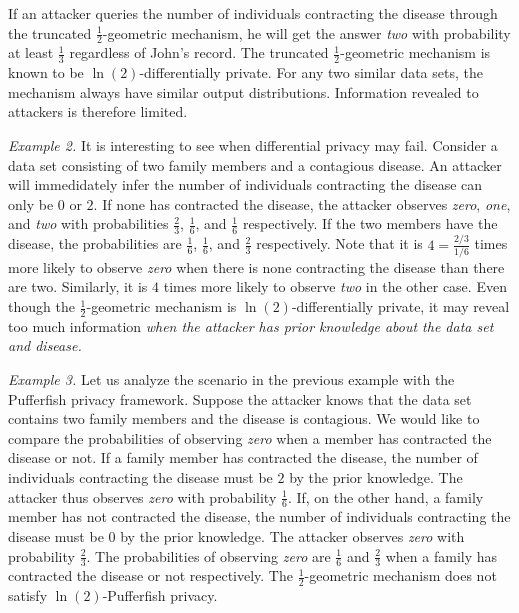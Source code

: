 If an attacker queries the number of individuals contracting the
disease through the truncated $\frac{1}{2}$-geometric mechanism, 
he will get the answer \textit{two} with probability at least
$\frac{1}{3}$ regardless of John's record. The truncated
$\frac{1}{2}$-geometric mechanism is known to be
$\ln(2)$-differentially private. For any two similar data sets, the
mechanism always have similar output distributions. Information
revealed to attackers is therefore limited.

\noindent
\textit{Example 2.}
It is interesting to see when differential privacy may fail. Consider
a data set consisting of two family members and a contagious
disease. An attacker will immedidately infer the number of individuals
contracting the disease can only be $0$ or $2$. If none has contracted
the disease, the attacker observes \textit{zero}, \textit{one}, and
\textit{two} with probabilities $\frac{2}{3}$, $\frac{1}{6}$, and
$\frac{1}{6}$ respectively. If the two members have the disease, the
probabilities are $\frac{1}{6}$, $\frac{1}{6}$, and $\frac{2}{3}$
respectively. Note that it is $4 = \frac{2/3}{1/6}$ times more likely
to observe \textit{zero} when there is none contracting the disease
than there are two. Similarly, it is $4$ times more likely to observe
\textit{two} in the other case. Even though the
$\frac{1}{2}$-geometric mechanism is $\ln(2)$-differentially private,
it may reveal too much information \emph{when the attacker has prior
 knowledge about the data set and disease.}


\noindent
\textit{Example 3.}
Let us analyze the scenario in the previous example with the
Pufferfish privacy framework. Suppose the attacker knows that the data
set contains two family members and the disease is contagious. We
would like to compare the probabilities of observing \textit{zero}
when a member has contracted the disease or not. If a family member
has contracted the disease, the number of individuals contracting
the disease must be $2$ by the prior knowledge. The attacker thus
observes \textit{zero} with probability $\frac{1}{6}$.
If, on the other hand, a family member has not contracted
the disease, the number of individuals contracting the disease must be
$0$ by the prior knowledge. The attacker observes \textit{zero}
with probability $\frac{2}{3}$. The probabilities of observing
\textit{zero} are $\frac{1}{6}$ and $\frac{2}{3}$ when a family
has contracted the disease or not respectively. The
$\frac{1}{2}$-geometric mechanism does not satisfy 
$\ln(2)$-Pufferfish privacy. 

